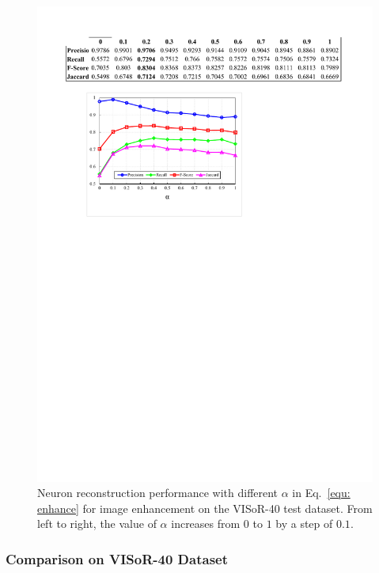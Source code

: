 \begin{figure}[t]
	\centering
	\includegraphics[width=0.8\columnwidth]{./Illustrations/weight_paprameter7.pdf}
	\caption{Neuron reconstruction performance with different $\alpha$ in Eq.~\eqref{equ: enhance} for image enhancement on the VISoR-40 test dataset. From left to right, the value of $\alpha$ increases from $0$ to $1$ by a step of $0.1$.  }
	\label{fig:weight_paprameter}
\end{figure}


\subsubsection{Comparison on VISoR-40 Dataset}



